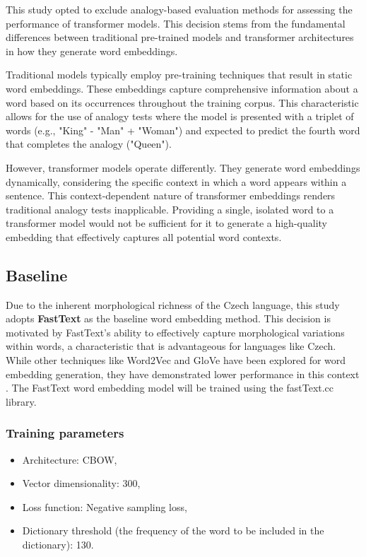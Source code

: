 This study opted to exclude analogy-based evaluation methods for assessing the performance of transformer models.
This decision stems from the fundamental differences between traditional pre-trained models and transformer architectures in how they generate word embeddings.

Traditional models typically employ pre-training techniques that result in static word embeddings.
These embeddings capture comprehensive information about a word based on its occurrences throughout the training corpus.
This characteristic allows for the use of analogy tests where the model is presented with a triplet of words (e.g., "King" - "Man" + "Woman") and expected to predict the fourth word that completes the analogy ("Queen").

However, transformer models operate differently.
They generate word embeddings dynamically, considering the specific context in which a word appears within a sentence.
This context-dependent nature of transformer embeddings renders traditional analogy tests inapplicable.
Providing a single, isolated word to a transformer model would not be sufficient for it to generate a high-quality embedding that effectively captures all potential word contexts.

\subsection{Baseline}
Due to the inherent morphological richness of the Czech language, this study adopts \textbf{FastText} as the baseline word embedding method.
This decision is motivated by FastText's ability to effectively capture morphological variations within words, a characteristic that is advantageous for languages like Czech.
While other techniques like Word2Vec and \ac{GloVe} have been explored for word embedding generation, they have demonstrated lower performance in this context \cite{bojanowski2017enriching}.
The FastText word embedding model will be trained using the fastText.cc library.

\subsubsection{Training parameters}
\begin{itemize}
  \item Architecture: \ac{CBOW},
  \item Vector dimensionality: 300,
  \item Loss function: Negative sampling loss,
  \item Dictionary threshold (the frequency of the word to be included in the dictionary): 130.
\end{itemize}

